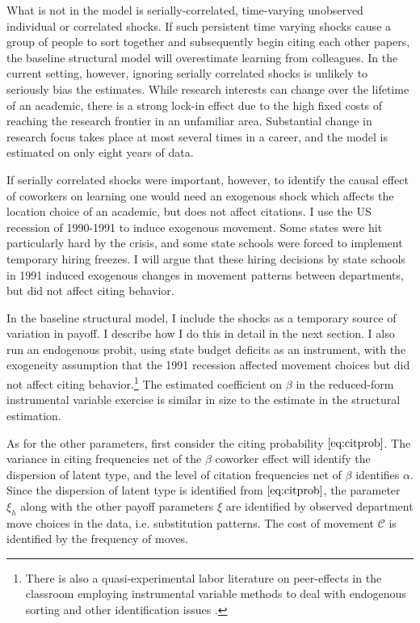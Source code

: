 \documentclass[]{article}
\begin{document}
What is not in the model is serially-correlated, time-varying unobserved
individual or correlated shocks. If such persistent time varying shocks cause a group of people to
sort together and subsequently begin citing each other papers, the
baseline structural model will overestimate learning from colleagues.
In the current setting, however, ignoring serially correlated shocks is 
unlikely to seriously bias the estimates.  While research interests can
change over the lifetime of an academic, there is a strong lock-in effect
due to the high fixed costs of reaching the research frontier in an unfamiliar
area.  Substantial change in research focus takes place at most
several times in a career, and the model is estimated on only eight
years of data.

If serially correlated shocks were important, however, to identify the
causal effect of coworkers on learning one would need an exogenous shock
which affects the location choice of an academic, but does not affect
citations.  I use the US recession of 1990-1991 to induce exogenous
movement. Some states were hit particularly hard by the crisis, and some
state schools were forced to implement temporary hiring freezes. I will
argue that these hiring decisions by state schools in 1991 induced
exogenous changes in movement patterns between departments, but did not
affect citing behavior.

In the baseline structural model, I include the shocks as a temporary
source of variation in payoff. I describe how I do this in detail
in the next section.  I also run an endogenous probit, using state budget
deficits as an instrument, with the exogeneity assumption that the 1991
recession affected movement choices but did not affect citing behavior.\footnote{
There is also a quasi-experimental labor literature
 on peer-effects in the classroom employing instrumental variable 
methods to deal with endogenous sorting and other identification issues 
\citep{kang2007classroom, de2010identification}.}
The estimated coefficient on $\beta$ in the reduced-form instrumental variable
exercise is similar in size to the estimate in the structural 
estimation.

As for the other parameters, first consider the citing probability
$\eqref{eq:citprob}$. The variance in citing frequencies net of the
$\beta$ coworker effect will identify the dispersion of latent type, and
the level of citation frequencies net of $\beta$ identifies $\alpha$.
Since the dispersion of latent type is identified from
$\eqref{eq:citprob}$, the parameter $\xi_h$ along with the other payoff
parameters $\xi$ are identified by observed department move choices in the data, i.e.
substitution patterns. The cost of movement $\mathcal{C}$ is
identified by the frequency of moves.
\end{document}
